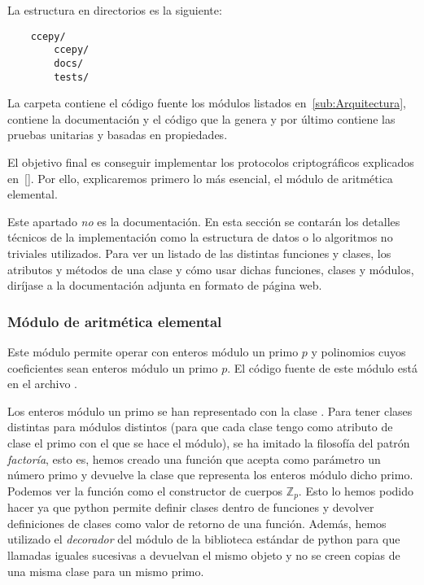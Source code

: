 La estructura en directorios es la siguiente:
\begin{verbatim}
    ccepy/
        ccepy/
        docs/
        tests/
\end{verbatim}
La carpeta  contiene el código fuente los módulos listados en~\ref{sub:Arquitectura},  contiene la documentación y el código que la genera y por último  contiene las pruebas unitarias y basadas en propiedades.

El objetivo final es conseguir implementar los protocolos criptográficos explicados en~\ref{}. Por ello, explicaremos primero lo más esencial, el módulo de aritmética elemental.

\begin{nota}
    Este apartado \emph{no} es la documentación. En esta sección se contarán los detalles técnicos de la implementación como la estructura de datos o lo algoritmos no triviales utilizados. Para ver un listado de las distintas funciones y clases, los atributos y métodos de una clase y cómo usar dichas funciones, clases y módulos, diríjase a la documentación adjunta en formato de página web.
\end{nota}

\subsubsection{Módulo de aritmética elemental}
\label{subs:Módulo de aritmética elemental}

Este módulo permite operar con enteros módulo un primo $p$ y polinomios
cuyos coeficientes sean enteros módulo un primo $p$. El código fuente de este módulo está en el archivo .

Los enteros módulo un primo se han representado con la clase . Para tener clases distintas para módulos distintos (para que cada clase tengo como atributo de clase el primo con el que se hace el módulo), se ha imitado la filosofía del patrón \emph{factoría}, esto es, hemos creado una función  que acepta como parámetro un número primo y devuelve la clase que representa los enteros módulo dicho primo. Podemos ver la función  como el constructor de cuerpos $\mathbb{Z}_p$. Esto lo hemos podido hacer ya que python permite definir clases dentro de funciones y devolver definiciones de clases como valor de retorno de una función. Además, hemos utilizado el \emph{decorador}  del módulo  de la biblioteca estándar de python para que llamadas iguales sucesivas a  devuelvan el mismo objeto y no se creen copias de una misma clase para un mismo primo.

